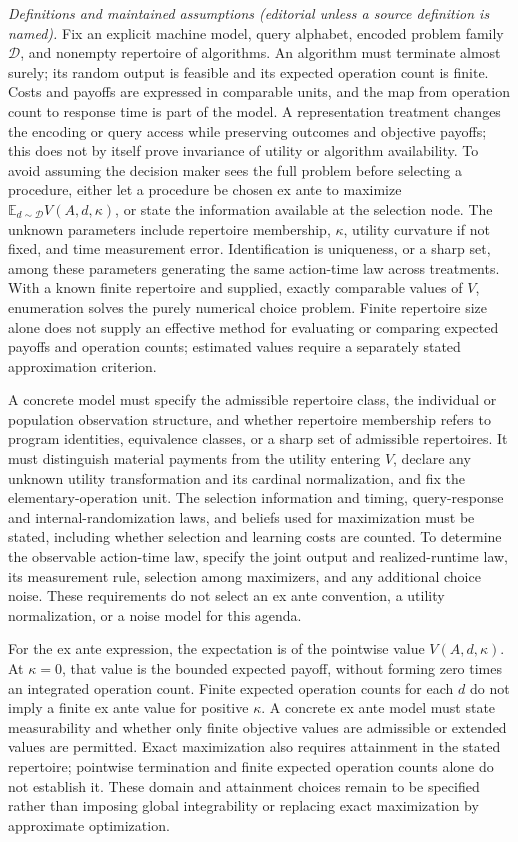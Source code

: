 \documentclass[11pt,a4paper]{article}
\begin{document}
\emph{Definitions and maintained assumptions (editorial unless a source definition is named).} Fix an explicit machine model, query alphabet, encoded problem family \(\mathcal D\), and nonempty repertoire of algorithms. An algorithm must terminate almost surely; its random output is feasible and its expected operation count is finite. Costs and payoffs are expressed in comparable units, and the map from operation count to response time is part of the model. A representation treatment changes the encoding or query access while preserving outcomes and objective payoffs; this does not by itself prove invariance of utility or algorithm availability. To avoid assuming the decision maker sees the full problem before selecting a procedure, either let a procedure be chosen ex ante to maximize \(\mathbb E_{d\sim\mathcal D}V(A,d,\kappa)\), or state the information available at the selection node. The unknown parameters include repertoire membership, \(\kappa\), utility curvature if not fixed, and time measurement error. Identification is uniqueness, or a sharp set, among these parameters generating the same action-time law across treatments. With a known finite repertoire and supplied, exactly comparable values of \(V\), enumeration solves the purely numerical choice problem. Finite repertoire size alone does not supply an effective method for evaluating or comparing expected payoffs and operation counts; estimated values require a separately stated approximation criterion.

A concrete model must specify the admissible repertoire class, the individual or population observation structure, and whether repertoire membership refers to program identities, equivalence classes, or a sharp set of admissible repertoires. It must distinguish material payments from the utility entering \(V\), declare any unknown utility transformation and its cardinal normalization, and fix the elementary-operation unit. The selection information and timing, query-response and internal-randomization laws, and beliefs used for maximization must be stated, including whether selection and learning costs are counted. To determine the observable action-time law, specify the joint output and realized-runtime law, its measurement rule, selection among maximizers, and any additional choice noise. These requirements do not select an ex ante convention, a utility normalization, or a noise model for this agenda.

For the ex ante expression, the expectation is of the pointwise value \(V(A,d,\kappa)\). At \(\kappa=0\), that value is the bounded expected payoff, without forming zero times an integrated operation count. Finite expected operation counts for each \(d\) do not imply a finite ex ante value for positive \(\kappa\). A concrete ex ante model must state measurability and whether only finite objective values are admissible or extended values are permitted. Exact maximization also requires attainment in the stated repertoire; pointwise termination and finite expected operation counts alone do not establish it. These domain and attainment choices remain to be specified rather than imposing global integrability or replacing exact maximization by approximate optimization.
\end{document}
